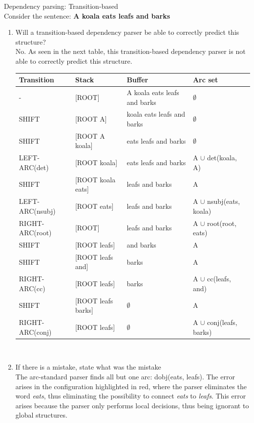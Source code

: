 \documentclass[12pt]{article}
\newenvironment{exercise}[2][Exercise]{\begin{trivlist}
\item[\hskip \labelsep {\bfseries #1}\hskip \labelsep {\bfseries #2.}]}{\end{trivlist}}
\begin{document}
\begin{exercise}{5} Dependency parsing: Transition-based \\
Consider the sentence: \textbf{A koala eats leafs and barks}
\begin{enumerate}[label=(\alph*)]

\item Will a transition-based dependency parser be able to correctly predict this structure? \\ 
No. As seen in the next table, this transition-based dependency parser is not able to correctly predict this structure. \\ 

\begin{tabular}{|p{35mm}|p{35mm}|p{35mm}|p{40mm}|} \hline
\textbf{Transition} & \textbf{Stack} & \textbf{Buffer} & \textbf{Arc set} \\ \hline
- & [ROOT] & A koala eats leafs and barks & $\emptyset$ \\ \hline
SHIFT & [ROOT A] & koala eats leafs and barks & $\emptyset$ \\ \hline
SHIFT & [ROOT A koala] & eats leafs and barks & $\emptyset$ \\ \hline
LEFT-ARC(det) & [ROOT koala] & eats leafs and barks & A $\cup$ det(koala, A) \\ \hline
SHIFT & [ROOT koala eats] & leafs and barks & A \\ \hline
LEFT-ARC(nsubj) & [ROOT eats] & leafs and barks & A $\cup$ nsubj(eats, koala) \\ \hline
{\color{red}RIGHT-ARC(root)} & {\color{red}[ROOT]} & {\color{red}leafs and barks} & {\color{red}A $\cup$ root(root, eats)} \\ \hline
SHIFT & [ROOT leafs] & and barks & A \\ \hline
SHIFT & [ROOT leafs and] & barks & A \\ \hline
RIGHT-ARC(cc) & [ROOT leafs] & barks & A $\cup$ cc(leafs, and) \\ \hline
SHIFT & [ROOT leafs barks] & $\emptyset$ & A \\ \hline
RIGHT-ARC(conj) & [ROOT leafs] & $\emptyset$ & A $\cup$ conj(leafs, barks) \\ \hline
\end{tabular} \\

\item If there is a mistake, state what was the mistake \\
The arc-standard parser finds all but one arc: dobj(eats, leafs). The error arises in the configuration highlighted in {\color{red}red}, where the parser eliminates the word \textit{eats}, thus eliminating the possibility to connect \textit{eats} to \textit{leafs}. This error arises because the parser only performs local decisions, thus being ignorant to global structures.

\end{enumerate}
\end{exercise} 
\end{document}
